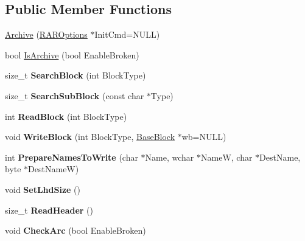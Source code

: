 \subsection*{Public Member Functions}
\begin{DoxyCompactItemize}
\item 
\hyperlink{class_archive_aba703027bcdb0596c0dc46246b5efe4f}{Archive} (\hyperlink{class_r_a_r_options}{R\-A\-R\-Options} $\ast$Init\-Cmd=N\-U\-L\-L)
\item 
bool \hyperlink{class_archive_a5445c9c5db9e139d956946acf04d9aef}{Is\-Archive} (bool Enable\-Broken)
\item 
\hypertarget{class_archive_a11853cfd858d0fc9d5583723bfa62a54}{size\-\_\-t {\bfseries Search\-Block} (int Block\-Type)}\label{class_archive_a11853cfd858d0fc9d5583723bfa62a54}

\item 
\hypertarget{class_archive_a05db17b3fd4ef286bbba22e082855762}{size\-\_\-t {\bfseries Search\-Sub\-Block} (const char $\ast$Type)}\label{class_archive_a05db17b3fd4ef286bbba22e082855762}

\item 
\hypertarget{class_archive_a18c7f105189398c7d54f51befbb5427d}{int {\bfseries Read\-Block} (int Block\-Type)}\label{class_archive_a18c7f105189398c7d54f51befbb5427d}

\item 
\hypertarget{class_archive_a6cda3c976a6a5cc6608207cdde3628e8}{void {\bfseries Write\-Block} (int Block\-Type, \hyperlink{struct_base_block}{Base\-Block} $\ast$wb=N\-U\-L\-L)}\label{class_archive_a6cda3c976a6a5cc6608207cdde3628e8}

\item 
\hypertarget{class_archive_aa953c24ed872d504a5cc3c5ce8d5c39f}{int {\bfseries Prepare\-Names\-To\-Write} (char $\ast$Name, wchar $\ast$Name\-W, char $\ast$Dest\-Name, byte $\ast$Dest\-Name\-W)}\label{class_archive_aa953c24ed872d504a5cc3c5ce8d5c39f}

\item 
\hypertarget{class_archive_a1f401ed0535fdb5b7c84b3cf5a23b9cf}{void {\bfseries Set\-Lhd\-Size} ()}\label{class_archive_a1f401ed0535fdb5b7c84b3cf5a23b9cf}

\item 
\hypertarget{class_archive_a09aba5cbd51c0ac9aaaac5da5ac4ec22}{size\-\_\-t {\bfseries Read\-Header} ()}\label{class_archive_a09aba5cbd51c0ac9aaaac5da5ac4ec22}

\item 
\hypertarget{class_archive_aefe3b900bd528f5340070107e5aaf187}{void {\bfseries Check\-Arc} (bool Enable\-Broken)}\label{class_archive_aefe3b900bd528f5340070107e5aaf187}


\end{DoxyCompactItemize}
